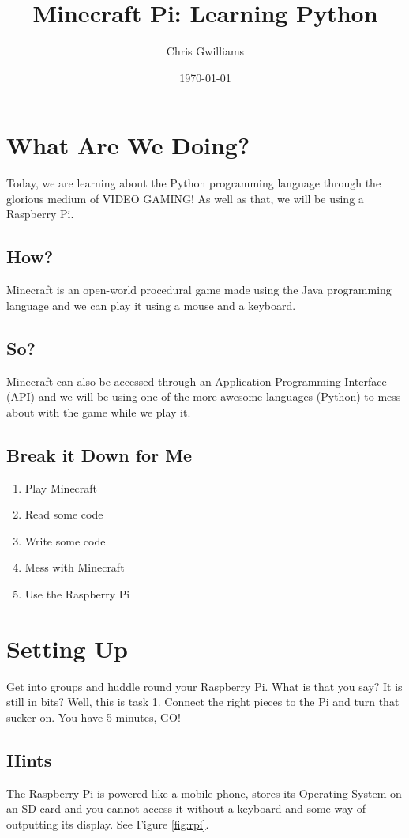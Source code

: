 \documentclass[]{paper}
\begin{document}
\title{Minecraft Pi: Learning Python}
\author{Chris Gwilliams}
\date{\today}
\maketitle

\section*{What Are We Doing?}
Today, we are learning about the Python programming language through the glorious medium of VIDEO GAMING! As well as that, we will be using a Raspberry Pi.
\subsection*{How?}
Minecraft is an open-world procedural game made using the Java programming language and we can play it using a mouse and a keyboard. 
\subsection*{So?}
Minecraft can also be accessed through an Application Programming Interface (API) and we will be using one of the more awesome languages (Python) to mess about with the game while we play it.
\subsection*{Break it Down for Me}
\begin{enumerate}
	\item Play Minecraft
	\item Read some code
	\item Write some code
	\item Mess with Minecraft
	\item Use the Raspberry Pi
\end{enumerate}

\section{Setting Up}
Get into groups and huddle round your Raspberry Pi. What is that you say? It is still in bits? Well, this is task 1. Connect the right pieces to the Pi and turn that sucker on. You have 5 minutes, GO!
\subsection*{Hints}
 	The Raspberry Pi is powered like a mobile phone, stores its Operating System on an SD card and you cannot access it without a keyboard and some way of outputting its display. See Figure \ref{fig:rpi}.
\end{document}

